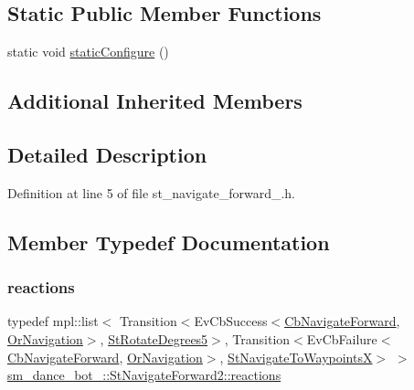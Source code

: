 \subsection*{Static Public Member Functions}
\begin{DoxyCompactItemize}
\item 
static void \hyperlink{structsm__dance__bot__2_1_1StNavigateForward2_a95f49a400b7ffb55303819076c06c3bd}{static\+Configure} ()
\end{DoxyCompactItemize}
\subsection*{Additional Inherited Members}


\subsection{Detailed Description}


Definition at line 5 of file st\+\_\+navigate\+\_\+forward\+\_.\+h.



\subsection{Member Typedef Documentation}
\mbox{\label{structsm__dance__bot__2_1_1StNavigateForward2_a5d4da6dd126fd94069809d50866bf08f}} 
\subsubsection{\texorpdfstring{reactions}{reactions}}
{\footnotesize\ttfamily typedef mpl\+::list$<$ Transition$<$Ev\+Cb\+Success$<$\hyperlink{classcl__move__base__z_1_1CbNavigateForward}{Cb\+Navigate\+Forward}, \hyperlink{classsm__dance__bot__2_1_1OrNavigation}{Or\+Navigation}$>$, \hyperlink{structsm__dance__bot__2_1_1StRotateDegrees5}{St\+Rotate\+Degrees5}$>$, Transition$<$Ev\+Cb\+Failure$<$\hyperlink{classcl__move__base__z_1_1CbNavigateForward}{Cb\+Navigate\+Forward}, \hyperlink{classsm__dance__bot__2_1_1OrNavigation}{Or\+Navigation}$>$, \hyperlink{structsm__dance__bot__2_1_1StNavigateToWaypointsX}{St\+Navigate\+To\+WaypointsX}$>$ $>$ \hyperlink{structsm__dance__bot__2_1_1StNavigateForward2_a5d4da6dd126fd94069809d50866bf08f}{sm\+\_\+dance\+\_\+bot\+\_\+::\+St\+Navigate\+Forward2\+::reactions}}



